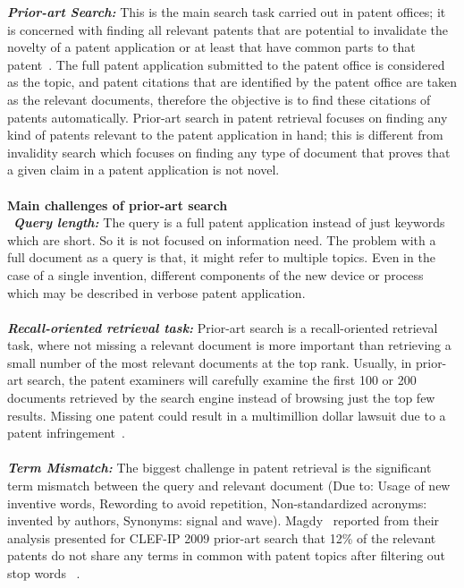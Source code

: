\textbf{\textit{Prior-art Search:}}
This is the main search task carried out in patent offices; it is concerned with finding all relevant patents that are potential to invalidate the novelty of a patent application or at least that have common parts to that patent~\citep{roda2010clef}. The full patent application submitted to the patent office is considered as the topic, and patent citations that are identified by the patent office are taken as the relevant documents, therefore the objective is to find these citations of patents automatically. Prior-art search in patent retrieval focuses on finding any kind of patents relevant to the patent application in hand; this is different from invalidity search which focuses on finding any type of document that proves that a given claim in a patent application is not novel.\\\\
\textbf{Main challenges of prior-art search}
\\ \
\textit{\textbf{Query length:}} The query is a full patent application instead of just keywords which are short. So it is not focused on information need. The problem with a full document as a query is that, it might refer to multiple topics. Even in the case of a single invention, different components of the new device or process which may be described in verbose patent application. \\\\
\textit{\textbf{Recall-oriented retrieval task:}} Prior-art search is a recall-oriented retrieval task, where not missing a relevant document is more important than retrieving a small number of the most relevant documents at the top rank. Usually, in prior-art search, the patent examiners will carefully examine the first 100 or 200 documents retrieved by the search engine instead of browsing just the top few results. Missing one patent could result in a multimillion dollar lawsuit due to a patent infringement~\citep{arampatzis2007access, magdy2010pres}. \\\\
\textit{\textbf{Term Mismatch: }} The biggest challenge in patent retrieval is the significant term mismatch between the query and relevant document (Due to: Usage of new inventive words, Rewording to avoid repetition, Non-standardized acronyms: invented by authors, Synonyms: signal and wave). Magdy~\citep{magdy2010exploring} reported from their analysis presented for CLEF-IP 2009 prior-art search that 12\% of the relevant patents do not share any terms in common with patent topics after filtering out stop words ~\citep{magdy2011study}.
